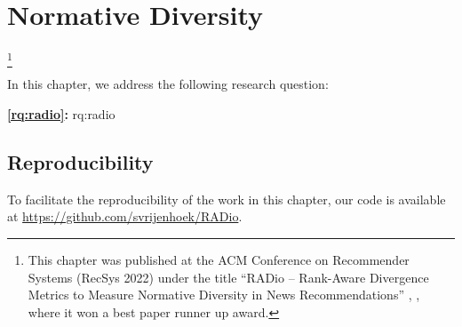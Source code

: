 
\chapter{Normative Diversity}
\label{chapter:research-radio}

\footnote[]{This chapter was published at the ACM Conference on Recommender Systems (RecSys 2022) under the title ``RADio – Rank-Aware Divergence Metrics to Measure Normative Diversity in News Recommendations'' \citep{radio}, , where it won a best paper runner up award.}
\acresetall

In this chapter, we address the following research question:

\medskip
\noindent
\textbf{\ref{rq:radio}:} \acl{rq:radio}
\medskip

\noindent





% 
% 
% 
% 
% 
% 
% 

\section*{Reproducibility}
To facilitate the reproducibility of the work in this chapter, our code is available at \url{https://github.com/svrijenhoek/RADio}.

